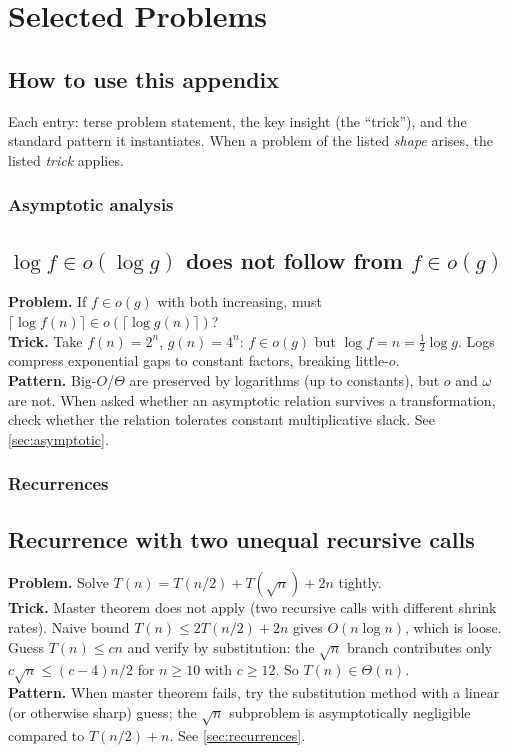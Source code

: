 \section{Selected Problems}
\label{sec:tricky}

\subsection*{How to use this appendix}
Each entry: terse problem statement, the key insight (the ``trick''), and the standard pattern it instantiates.
When a problem of the listed \emph{shape} arises, the listed \emph{trick} applies.

\subsubsection*{Asymptotic analysis}

\subsection{\texorpdfstring{$\log f \in o(\log g)$ does not follow from $f \in o(g)$}{log f in o(log g) does not follow from f in o(g)}}
\textbf{Problem.} If $f \in o(g)$ with both increasing, must $\lceil \log f(n)\rceil \in o(\lceil \log g(n)\rceil)$?\\
\textbf{Trick.} Take $f(n) = 2^n$, $g(n) = 4^n$: $f \in o(g)$ but $\log f = n = \tfrac{1}{2}\log g$. Logs compress exponential gaps to constant factors, breaking little-$o$.\\
\textbf{Pattern.} Big-$O$/$\Theta$ are preserved by logarithms (up to constants), but $o$ and $\omega$ are not. When asked whether an asymptotic relation survives a transformation, check whether the relation tolerates constant multiplicative slack. See \cref{sec:asymptotic}.

\subsubsection*{Recurrences}

\subsection{Recurrence with two unequal recursive calls}
\textbf{Problem.} Solve $T(n) = T(n/2) + T(\sqrt{n}) + 2n$ tightly.\\
\textbf{Trick.} Master theorem does not apply (two recursive calls with different shrink rates). Naive bound $T(n) \leq 2T(n/2) + 2n$ gives $O(n\log n)$, which is loose. Guess $T(n) \leq cn$ and verify by substitution: the $\sqrt{n}$ branch contributes only $c\sqrt{n} \leq (c-4)n/2$ for $n \geq 10$ with $c \geq 12$. So $T(n) \in \Theta(n)$.\\
\textbf{Pattern.} When master theorem fails, try the substitution method with a linear (or otherwise sharp) guess; the $\sqrt{n}$ subproblem is asymptotically negligible compared to $T(n/2) + n$. See \cref{sec:recurrences}.

